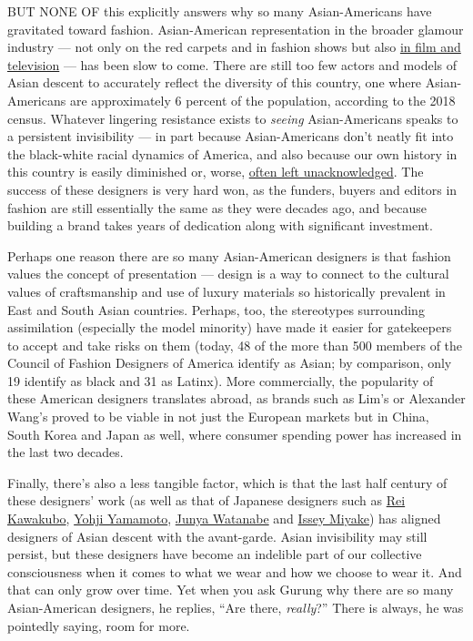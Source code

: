 BUT NONE OF this explicitly answers why so many Asian-Americans have
gravitated toward fashion. Asian-American representation in the broader
glamour industry --- not only on the red carpets and in fashion shows
but also
\href{https://www.nytimes3xbfgragh.onion/2018/11/06/t-magazine/asian-american-actors-representation.html}{in
film and television} --- has been slow to come. There are still too few
actors and models of Asian descent to accurately reflect the diversity
of this country, one where Asian-Americans are approximately 6 percent
of the population, according to the 2018 census. Whatever lingering
resistance exists to \emph{seeing} Asian-Americans speaks to a
persistent invisibility --- in part because Asian-Americans don't neatly
fit into the black-white racial dynamics of America, and also because
our own history in this country is easily diminished or, worse,
\href{https://www.nytimes3xbfgragh.onion/2019/11/04/t-magazine/japanese-american-novel.html}{often
left unacknowledged}. The success of these designers is very hard won,
as the funders, buyers and editors in fashion are still essentially the
same as they were decades ago, and because building a brand takes years
of dedication along with significant investment.

Perhaps one reason there are so many Asian-American designers is that
fashion values the concept of presentation --- design is a way to
connect to the cultural values of craftsmanship and use of luxury
materials so historically prevalent in East and South Asian countries.
Perhaps, too, the stereotypes surrounding assimilation (especially the
model minority) have made it easier for gatekeepers to accept and take
risks on them (today, 48 of the more than 500 members of the Council of
Fashion Designers of America identify as Asian; by comparison, only 19
identify as black and 31 as Latinx). More commercially, the popularity
of these American designers translates abroad, as brands such as Lim's
or Alexander Wang's proved to be viable in not just the European markets
but in China, South Korea and Japan as well, where consumer spending
power has increased in the last two decades.

Finally, there's also a less tangible factor, which is that the last
half century of these designers' work (as well as that of Japanese
designers such as
\href{https://www.nytimes3xbfgragh.onion/2018/09/03/t-magazine/rei-kawakubo-comme-des-garcons-menswear.html}{Rei
Kawakubo}, \href{https://theshopyohjiyamamoto.com/}{Yohji Yamamoto},
\href{https://www.nytimes3xbfgragh.onion/2016/10/17/t-magazine/junya-watanabe-interview.html}{Junya
Watanabe} and \href{https://www.isseymiyake.com/en/}{Issey Miyake}) has
aligned designers of Asian descent with the avant-garde. Asian
invisibility may still persist, but these designers have become an
indelible part of our collective consciousness when it comes to what we
wear and how we choose to wear it. And that can only grow over time. Yet
when you ask Gurung why there are so many Asian-American designers, he
replies, ``Are there, \emph{really}?'' There is always, he was pointedly
saying, room for more.

